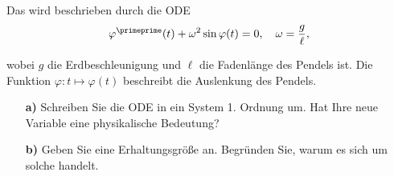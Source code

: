 \begin{exercise}

Das  wird beschrieben durch die ODE
\begin{align*}
  \varphi^\primeprime(t) + \omega^2 \sin{\varphi(t)} = 0,
  \quad
  \omega = \frac{g}{\ell},
\end{align*}

wobei $g$ die Erdbeschleunigung und $\ell$ die Fadenlänge des Pendels ist. Die Funktion $\varphi: t \mapsto \varphi(t)$ beschreibt die Auslenkung des Pendels.

\begin{itemize}

  \item[\textbf{a)}] Schreiben Sie die ODE in ein System 1. Ordnung um. Hat Ihre neue Variable eine physikalische
  Bedeutung?

  \item[\textbf{b)}] Geben Sie eine Erhaltungsgröße an. Begründen Sie, warum es sich um solche handelt.

\end{itemize}

\end{exercise}

